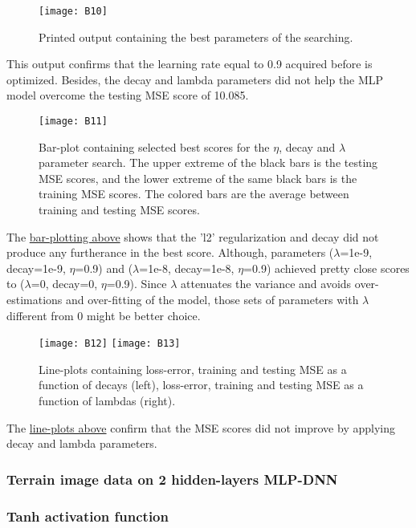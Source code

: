\begin{figure}[H]
\label{fig:B7}
\centering
\texttt{[image: B10]}
\caption{Printed output containing the best parameters of the searching.}
\end{figure}

This output confirms that the learning rate equal to 0.9 acquired before is optimized. Besides, the decay and lambda parameters did not help the MLP model overcome the testing MSE score of 10.085.

\begin{figure}[H]
\label{fig:B8}
\centering
\texttt{[image: B11]}
\caption{Bar-plot containing selected best scores for the $\eta$, decay and $\lambda$ parameter search. The upper extreme of the black bars is the testing MSE scores, and the lower extreme of the same black bars is the training MSE scores. The colored bars are the average between training and testing MSE scores.}
\end{figure}

The \hyperref[fig:B8]{bar-plotting above} shows that the 'l2' regularization and decay did not produce any furtherance in the best score. Although, parameters ($\lambda$=1e-9, decay=1e-9, $\eta$=0.9) and ($\lambda$=1e-8, decay=1e-8, $\eta$=0.9) achieved pretty close scores to ($\lambda$=0, decay=0, $\eta$=0.9). Since $\lambda$ attenuates the variance and avoids over-estimations and over-fitting of the model, those sets of parameters with $\lambda$ different from 0 might be better choice.

\begin{figure}[H]
\label{fig:B9}
\centering
\texttt{[image: B12]}
\texttt{[image: B13]}
\caption{Line-plots containing loss-error, training and testing MSE as a function of decays (left), loss-error, training and testing MSE as a function of lambdas (right).}
\end{figure}

The \hyperref[fig:B9]{line-plots above} confirm that the MSE scores did not improve by applying decay and lambda parameters.

\subsubsection{Terrain image data on 2 hidden-layers MLP-DNN}
\label{chap:Terrain image data on 2 hidden-layers MLP-DNN}

\subsubsection{Tanh activation function}
\label{chap:Tanh activation function}

